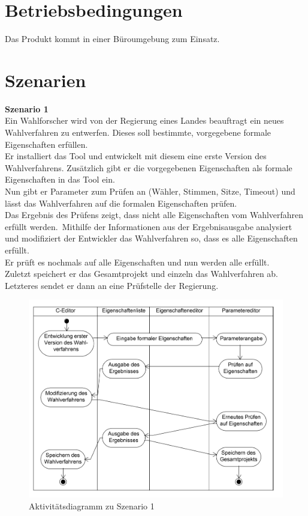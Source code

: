 \documentclass[a4paper]{scrreprt}
\begin{document}
\section{Betriebsbedingungen}
Das Produkt kommt in einer Büroumgebung zum Einsatz.


\section{Szenarien}
\textbf{Szenario 1}\\
Ein Wahlforscher wird von der Regierung eines Landes beauftragt ein neues Wahlverfahren zu entwerfen. Dieses soll bestimmte, vorgegebene formale Eigenschaften erfüllen.\\
Er installiert das Tool und entwickelt mit diesem eine erste Version des Wahlverfahrens. Zusätzlich gibt er die vorgegebenen Eigenschaften als formale Eigenschaften in das Tool ein.\\
Nun gibt er Parameter zum Prüfen an (Wähler, Stimmen, Sitze, Timeout) und lässt das Wahlverfahren auf die formalen Eigenschaften prüfen.\\
Das Ergebnis des Prüfens zeigt, dass nicht alle Eigenschaften vom Wahlverfahren erfüllt werden.\
Mithilfe der Informationen aus der Ergebnisausgabe analysiert und modifiziert der Entwickler das Wahlverfahren so, dass es alle Eigenschaften erfüllt.\\
Er prüft es nochmals auf alle Eigenschaften und nun werden alle erfüllt.\\
Zuletzt speichert er das Gesamtprojekt und einzeln das Wahlverfahren ab. Letzteres sendet er dann an eine Prüfstelle der Regierung.

\begin{figure}[H]
\includegraphics[scale=0.12]{ActivityDiagramScenario1.png}
\caption{Aktivitätsdiagramm zu Szenario 1}
\label{Packet-scetch}
\end{figure}
\end{document}
